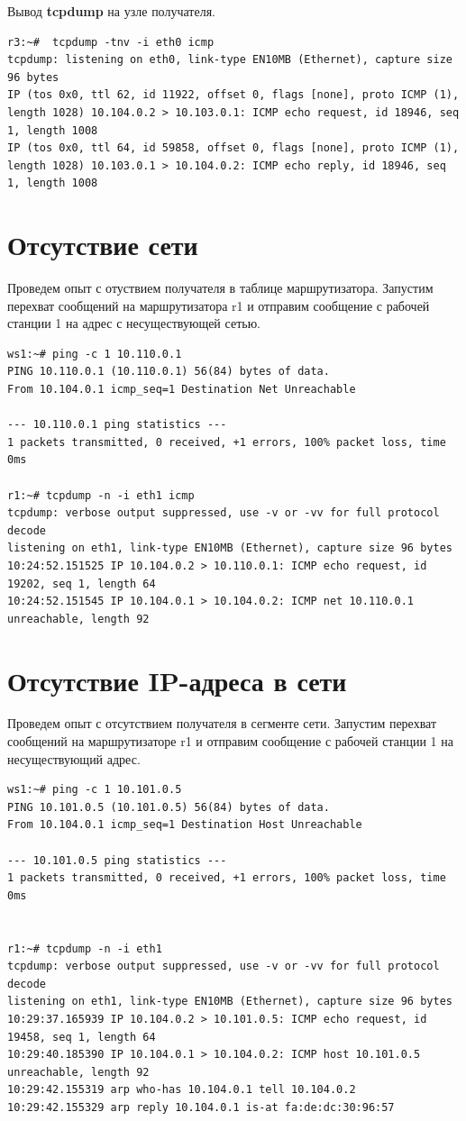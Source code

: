 \documentclass[a4paper,12pt]{article}
\begin{document}
Вывод \textbf{tcpdump} на узле получателя.

\begin{Verbatim}
r3:~#  tcpdump -tnv -i eth0 icmp
tcpdump: listening on eth0, link-type EN10MB (Ethernet), capture size 96 bytes
IP (tos 0x0, ttl 62, id 11922, offset 0, flags [none], proto ICMP (1), length 1028) 10.104.0.2 > 10.103.0.1: ICMP echo request, id 18946, seq 1, length 1008
IP (tos 0x0, ttl 64, id 59858, offset 0, flags [none], proto ICMP (1), length 1028) 10.103.0.1 > 10.104.0.2: ICMP echo reply, id 18946, seq 1, length 1008
\end{Verbatim}


\section{Отсутствие сети}

Проведем опыт с отуствием получателя в таблице маршрутизатора. Запустим перехват сообщений на маршрутизатора r1 и отправим сообщение с рабочей станции 1 на адрес с несуществующей сетью.

\begin{Verbatim}
ws1:~# ping -c 1 10.110.0.1
PING 10.110.0.1 (10.110.0.1) 56(84) bytes of data.
From 10.104.0.1 icmp_seq=1 Destination Net Unreachable

--- 10.110.0.1 ping statistics ---
1 packets transmitted, 0 received, +1 errors, 100% packet loss, time 0ms

r1:~# tcpdump -n -i eth1 icmp
tcpdump: verbose output suppressed, use -v or -vv for full protocol decode
listening on eth1, link-type EN10MB (Ethernet), capture size 96 bytes
10:24:52.151525 IP 10.104.0.2 > 10.110.0.1: ICMP echo request, id 19202, seq 1, length 64
10:24:52.151545 IP 10.104.0.1 > 10.104.0.2: ICMP net 10.110.0.1 unreachable, length 92
\end{Verbatim}


\section{Отсутствие IP-адреса в сети}

Проведем опыт с отсутствием получателя в сегменте сети. Запустим перехват сообщений на маршрутизаторе r1 и отправим сообщение с рабочей станции 1 на несуществующий адрес.

\begin{Verbatim}
ws1:~# ping -c 1 10.101.0.5
PING 10.101.0.5 (10.101.0.5) 56(84) bytes of data.
From 10.104.0.1 icmp_seq=1 Destination Host Unreachable

--- 10.101.0.5 ping statistics ---
1 packets transmitted, 0 received, +1 errors, 100% packet loss, time 0ms


r1:~# tcpdump -n -i eth1
tcpdump: verbose output suppressed, use -v or -vv for full protocol decode
listening on eth1, link-type EN10MB (Ethernet), capture size 96 bytes
10:29:37.165939 IP 10.104.0.2 > 10.101.0.5: ICMP echo request, id 19458, seq 1, length 64
10:29:40.185390 IP 10.104.0.1 > 10.104.0.2: ICMP host 10.101.0.5 unreachable, length 92
10:29:42.155319 arp who-has 10.104.0.1 tell 10.104.0.2
10:29:42.155329 arp reply 10.104.0.1 is-at fa:de:dc:30:96:57

\end{Verbatim}
\end{document}
